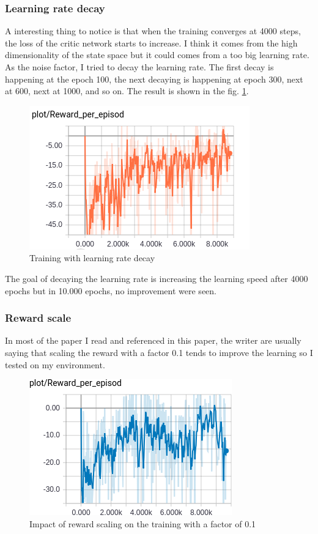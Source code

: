 \documentclass{article}
\begin{document}
\subsubsection{Learning rate decay}

A interesting thing to notice is that when the training converges at 4000 steps, the
loss of the critic network starts to increase. I think it comes from the
high dimensionality of the state space but it could comes from a too big
learning rate. As the noise factor, I tried to decay the learning rate. The
first decay is happening at the epoch 100, the next decaying is happening at
epoch 300, next at 600, next at 1000, and so on. The result is shown in the fig.
\ref{fig:study_decay_lr}.

\begin{figure}[ht]
  \centering
  \includegraphics[width=.5\textwidth]{study_decay_lr}
  \caption{Training with learning rate decay}
  \label{fig:study_decay_lr}
\end{figure}

The goal of decaying the learning rate is increasing the learning speed after
4000 epochs but in 10.000 epochs, no improvement were seen. 

\newpage
\subsubsection{Reward scale}

In most of the paper I read and referenced in this paper, the writer are usually
saying that scaling the reward with a factor 0.1 tends to improve the learning so
I tested on my environment.

\begin{figure}[ht]
  \centering
  \includegraphics[width=.5\textwidth]{study_reward_scaling}
  \caption{Impact of reward scaling on the training with a factor of 0.1}
  \label{fig:study_reward_scaling}
\end{figure}
\end{document}
